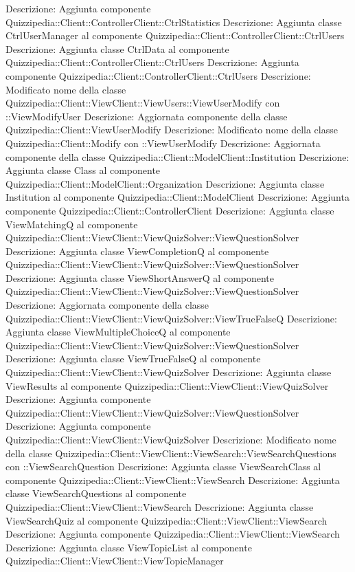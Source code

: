 Descrizione: Aggiunta componente Quizzipedia::Client::ControllerClient::CtrlStatistics 
Descrizione: Aggiunta classe CtrlUserManager al componente Quizzipedia::Client::ControllerClient::CtrlUsers 
Descrizione: Aggiunta classe CtrlData al componente Quizzipedia::Client::ControllerClient::CtrlUsers 
Descrizione: Aggiunta componente Quizzipedia::Client::ControllerClient::CtrlUsers 
Descrizione: Modificato nome della classe Quizzipedia::Client::ViewClient::ViewUsers::ViewUserModify con ::ViewModifyUser 
Descrizione: Aggiornata componente della classe Quizzipedia::Client::ViewUserModify 
Descrizione: Modificato nome della classe Quizzipedia::Client::Modify con ::ViewUserModify 
Descrizione: Aggiornata componente della classe Quizzipedia::Client::ModelClient::Institution 
Descrizione: Aggiunta classe Class al componente Quizzipedia::Client::ModelClient::Organization 
Descrizione: Aggiunta classe Institution al componente Quizzipedia::Client::ModelClient 
Descrizione: Aggiunta componente Quizzipedia::Client::ControllerClient 
Descrizione: Aggiunta classe ViewMatchingQ al componente Quizzipedia::Client::ViewClient::ViewQuizSolver::ViewQuestionSolver 
Descrizione: Aggiunta classe ViewCompletionQ al componente Quizzipedia::Client::ViewClient::ViewQuizSolver::ViewQuestionSolver 
Descrizione: Aggiunta classe ViewShortAnswerQ al componente Quizzipedia::Client::ViewClient::ViewQuizSolver::ViewQuestionSolver 
Descrizione: Aggiornata componente della classe Quizzipedia::Client::ViewClient::ViewQuizSolver::ViewTrueFalseQ 
Descrizione: Aggiunta classe ViewMultipleChoiceQ al componente Quizzipedia::Client::ViewClient::ViewQuizSolver::ViewQuestionSolver 
Descrizione: Aggiunta classe ViewTrueFalseQ al componente Quizzipedia::Client::ViewClient::ViewQuizSolver 
Descrizione: Aggiunta classe ViewResults al componente Quizzipedia::Client::ViewClient::ViewQuizSolver 
Descrizione: Aggiunta componente Quizzipedia::Client::ViewClient::ViewQuizSolver::ViewQuestionSolver 
Descrizione: Aggiunta componente Quizzipedia::Client::ViewClient::ViewQuizSolver 
Descrizione: Modificato nome della classe Quizzipedia::Client::ViewClient::ViewSearch::ViewSearchQuestions con ::ViewSearchQuestion 
Descrizione: Aggiunta classe ViewSearchClass al componente Quizzipedia::Client::ViewClient::ViewSearch 
Descrizione: Aggiunta classe ViewSearchQuestions al componente Quizzipedia::Client::ViewClient::ViewSearch 
Descrizione: Aggiunta classe ViewSearchQuiz al componente Quizzipedia::Client::ViewClient::ViewSearch 
Descrizione: Aggiunta componente Quizzipedia::Client::ViewClient::ViewSearch 
Descrizione: Aggiunta classe ViewTopicList al componente Quizzipedia::Client::ViewClient::ViewTopicManager 
